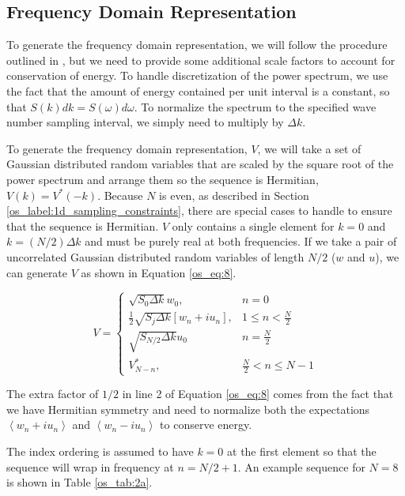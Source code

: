 \subsection {Frequency Domain Representation}
To generate the frequency domain representation, we will follow the procedure outlined in \cite{percival_spectra}, but we need to provide some additional scale factors to account for conservation of energy. To handle discretization of the power spectrum, we use the fact that the amount of energy contained per unit interval is a constant, so that $S(k)dk = S(\omega) d\omega$. To normalize the spectrum to the specified wave number sampling interval, we simply need to multiply by $\Delta k$.

To generate the frequency domain representation, $V$, we will take a set of Gaussian distributed random variables that are scaled  by the square root of the power spectrum and arrange them so the sequence is Hermitian, $V(k) = V^*(-k)$. Because $N$ is even, as described in Section \ref{os_label:1d_sampling_constraints}, there are special cases to handle to ensure that the sequence is Hermitian. $V$ only contains a single element for $k = 0$ and $k = (N/2)\Delta k$ and must be purely real at both frequencies. If we take a pair of uncorrelated Gaussian distributed random variables of length $N/2$ ($w$ and $u$), we can generate $V$ as shown in Equation \ref{os_eq:8}.

\begin{equation}
  \label{os_eq:8}   
  V = \begin{cases}
    \sqrt{S_0\Delta k}w_0, & n = 0 \\
    \frac{1}{2}\sqrt{S_j\Delta k}\left[w_n + iu_n \right], & 1 \leq n < \frac{N}{2} \\
   \sqrt{S_{N/2}\Delta k}u_0 & n = \frac{N}{2} \\
    V_{N-n}^*, &  \frac{N}{2} < n \leq N-1 
  \end{cases} 
\end{equation}
\renewcommand{\baselinestretch}{2} \small\normalsize

The extra factor of $1/2$ in line 2 of Equation \ref{os_eq:8} comes from the fact that we have Hermitian symmetry and need to normalize both the expectations $\left<w_n + iu_n\right>$ and $\left<w_n - iu_n\right>$ to conserve energy.

The index ordering is assumed to have $k=0$ at the first element so that the sequence will wrap in frequency at $n = N/2 + 1$. An example sequence for $N = 8$ is shown in Table \ref{os_tab:2a}.

